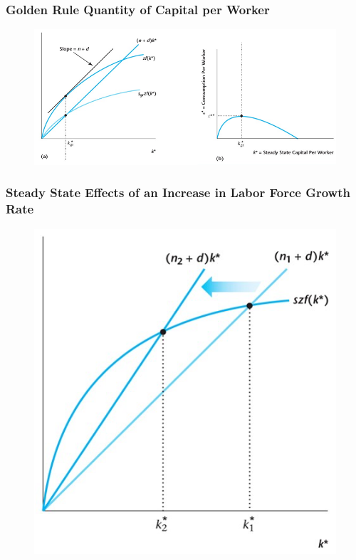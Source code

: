 \documentclass{beamer}
\begin{document}
\begin{frame}
\frametitle[alignment=center]{Golden Rule Quantity of Capital per Worker}
\begin{figure}
\centering
\includegraphics[scale=0.5]{Figures/W_Fig_7pt18.png}
\end{figure}
\end{frame}

\begin{frame}
\frametitle[alignment=center]{Steady State Effects of an Increase in Labor Force Growth Rate}
\begin{figure}
\centering
\includegraphics[scale=0.5]{Figures/W_Fig_7pt19.png}
\end{figure}
\end{frame}
\end{document}
